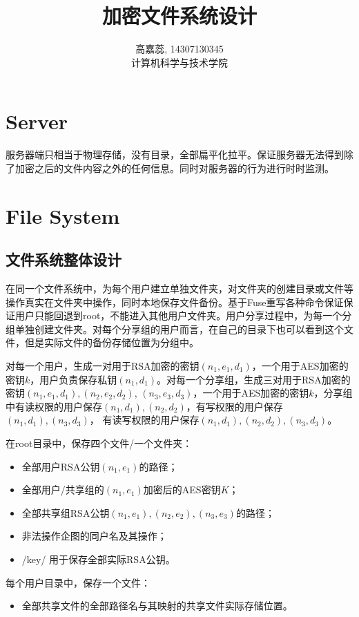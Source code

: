 \documentclass[11pt, oneside]{ctexart}
\begin{document}
\title{加密文件系统设计}
\author{高嘉蕊, 14307130345 \\ 计算机科学与技术学院}
\maketitle

\section{Server}
服务器端只相当于物理存储，没有目录，全部扁平化拉平。保证服务器无法得到除了加密之后的文件内容之外的任何信息。同时对服务器的行为进行时时监测。


\section{File System}
\subsection{文件系统整体设计}
在同一个文件系统中，为每个用户建立单独文件夹，对文件夹的创建目录或文件等操作真实在文件夹中操作，同时本地保存文件备份。基于Fuse重写各种命令保证保证用户只能回退到root，不能进入其他用户文件夹。用户分享过程中，为每一个分组单独创建文件夹。对每个分享组的用户而言，在自己的目录下也可以看到这个文件，但是实际文件的备份存储位置为分组中。

对每一个用户，生成一对用于RSA加密的密钥$(n_1, e_1, d_1)$，一个用于AES加密的密钥$k$，用户负责保存私钥$(n_1, d_1)$。对每一个分享组，生成三对用于RSA加密的密钥$(n_1, e_1, d_1), (n_2, e_2, d_2)$, $(n_3, e_3, d_3)$，一个用于AES加密的密钥$k$，分享组中有读权限的用户保存$(n_1, d_1), (n_2, d_2)$，有写权限的用户保存$(n_1, d_1), (n_3, d_3)$，
有读写权限的用户保存$(n_1, d_1), (n_2, d_2), (n_3, d_3)$。

在root目录中，保存四个文件/一个文件夹：
\begin{itemize}
\item 全部用户RSA公钥$(n_1, e_1)$的路径；
\item 全部用户/共享组的$(n_1, e_1)$加密后的AES密钥$K$；
\item 全部共享组RSA公钥$(n_1, e_1), (n_2, e_2), (n_3, e_3)$的路径；
\item 非法操作企图的同户名及其操作；
\item /key/ 用于保存全部实际RSA公钥。
\end{itemize}

每个用户目录中，保存一个文件：
\begin{itemize}
\item 全部共享文件的全部路径名与其映射的共享文件实际存储位置。
\end{itemize}
\end{document}
